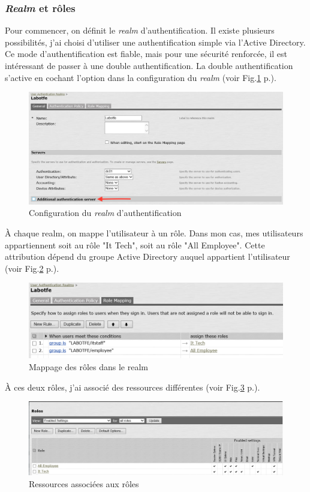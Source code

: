 \subsubsection{\textit{Realm} et rôles}
Pour commencer, on définit le \textit{realm} d'authentification.
Il existe plusieurs possibilités, j'ai choisi d'utiliser une authentification simple via l'Active Directory.
Ce mode d'authentification est fiable, mais pour une sécurité renforcée, il est intéressant de passer à une double authentification.
La double authentification s'active en cochant l'option dans la configuration du \textit{realm} (voir Fig.\ref{fig:confRealm} p.\pageref{fig:confRealm}).
\begin{figure}[ht]
	\centering
	\includegraphics[width=16cm]{juniper/Authserv.png}
	\caption{Configuration du \textit{realm} d'authentification}
	\label{fig:confRealm}
\end{figure}

À chaque realm, on mappe l'utilisateur à un rôle.
Dans mon cas, mes utilisateurs appartiennent soit au rôle "It Tech", soit au rôle "All Employee".
Cette attribution dépend du groupe Active Directory auquel appartient l'utilisateur (voir Fig.\ref{fig:mapRoles} p.\pageref{fig:mapRoles}). 
\begin{figure}[ht]
	\centering
	\includegraphics[width=16cm]{juniper/Rolemapping.png}
	\caption{Mappage des rôles dans le realm}
	\label{fig:mapRoles}
\end{figure}

À ces deux rôles, j'ai associé des ressources différentes (voir Fig.\ref{fig:resRoles} p.\pageref{fig:resRoles}).
\begin{figure}[ht]
	\centering
	\includegraphics[width=16cm]{juniper/UserRoles.png}
	\caption{Ressources associées aux rôles}
	\label{fig:resRoles}
\end{figure}

